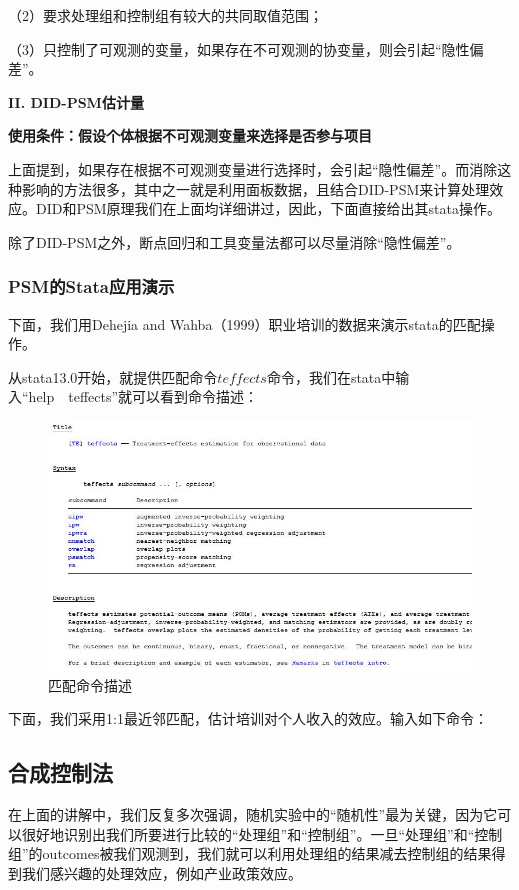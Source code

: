 \documentclass[cn,12pt,math=newtx,citestyle=gb7714-2015,bibstyle=gb7714-2015]{elegantbook}
\begin{document}
	（2）要求处理组和控制组有较大的共同取值范围；
	
	（3）只控制了可观测的变量，如果存在不可观测的协变量，则会引起“隐性偏差”。
	
	
	
	\textbf{II. DID-PSM估计量}
	
	\textbf{使用条件：假设个体根据不可观测变量来选择是否参与项目}
	
	上面提到，如果存在根据不可观测变量进行选择时，会引起“隐性偏差”。而消除这种影响的方法很多，其中之一就是利用面板数据，且结合DID-PSM来计算处理效应。DID和PSM原理我们在上面均详细讲过，因此，下面直接给出其stata操作。
	
	除了DID-PSM之外，断点回归和工具变量法都可以尽量消除“隐性偏差”。
	
	\subsubsection{PSM的Stata应用演示}
	
	下面，我们用Dehejia and Wahba（1999）职业培训的数据来演示stata的匹配操作。
	
	从stata13.0开始，就提供匹配命令$teffects$命令，我们在stata中输入“help~~teffects”就可以看到命令描述：
	
	\begin{figure}[htbp]
		\centering
		\includegraphics[width=1\textwidth]{teffects.jpg}
		\caption{匹配命令描述}\label{fig:digit}
	\end{figure}
	
	下面，我们采用1:1最近邻匹配，估计培训对个人收入的效应。输入如下命令：
	
	
	
	
	\subsection{合成控制法}
	在上面的讲解中，我们反复多次强调，随机实验中的“随机性”最为关键，因为它可以很好地识别出我们所要进行比较的“处理组”和“控制组”。一旦“处理组”和“控制组”的outcomes被我们观测到，我们就可以利用处理组的结果减去控制组的结果得到我们感兴趣的处理效应，例如产业政策效应。
	
\end{document}
